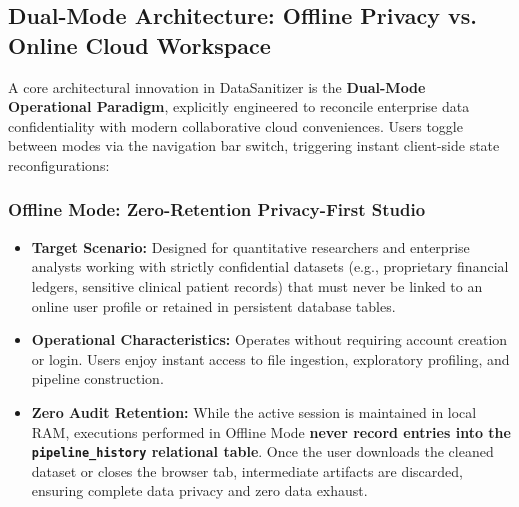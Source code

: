 \subsection{Dual-Mode Architecture: Offline Privacy vs. Online Cloud Workspace}
A core architectural innovation in DataSanitizer is the \textbf{Dual-Mode Operational Paradigm}, explicitly engineered to reconcile enterprise data confidentiality with modern collaborative cloud conveniences. Users toggle between modes via the navigation bar switch, triggering instant client-side state reconfigurations:

\subsubsection{Offline Mode: Zero-Retention Privacy-First Studio}
\begin{itemize}
  \item \textbf{Target Scenario:} Designed for quantitative researchers and enterprise analysts working with strictly confidential datasets (e.g., proprietary financial ledgers, sensitive clinical patient records) that must never be linked to an online user profile or retained in persistent database tables.
  \item \textbf{Operational Characteristics:} Operates without requiring account creation or login. Users enjoy instant access to file ingestion, exploratory profiling, and pipeline construction.
  \item \textbf{Zero Audit Retention:} While the active session is maintained in local RAM, executions performed in Offline Mode \textbf{never record entries into the \texttt{pipeline\_history} relational table}. Once the user downloads the cleaned dataset or closes the browser tab, intermediate artifacts are discarded, ensuring complete data privacy and zero data exhaust.
\end{itemize}

